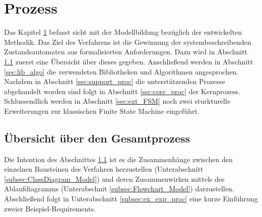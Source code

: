 
\chapter{Prozess}
\label{chap:Model}
Das Kapitel \ref{chap:Model} befasst sicht mit der Modellbildung bezüglich der entwickelten Methodik. Das Ziel des Verfahrens ist die Gewinnung der systembeschreibenden Zustandsautomaten aus formalisierten Anforderungen. Dazu wird in Abschnitt \ref{sec:Overview_Model} zuerst eine Übersicht über dieses gegeben. Anschließend werden in Abschnitt \ref{sec:lib_algo} die verwendeten Bibliotheken und Algorithmen angesprochen. Nachdem in Abschnitt \ref{sec:support_proc} die unterstützenden Prozesse abgehandelt worden sind folgt in Abschnitt \ref{sec:core_proc} der Kernprozess. Schlussendlich werden in Abschnitt \ref{sec:ext_FSM} noch zwei sturkturelle Erweiterungen zur klassischen Finite State Machine eingeführt.

\section{Übersicht über den Gesamtprozess}
\label{sec:Overview_Model}
Die Intention des Abschnittes \ref{sec:Overview_Model} ist es die Zusammenhänge zwischen den einzelnen Bausteinen des Verfahren herzustellen (Unterabschnitt \ref{subsec:ClassDiagram_Model}) und deren Zusammenwirken mittels des Ablaufdiagramms (Unterabschnit \ref{subsec:Flowchart_Model}) darzustellen. Abschließend folgt in Unterabschnitt \ref{subsec:ex_exp_proc} eine kurze Einführung zweier Beispiel-Requirements.
